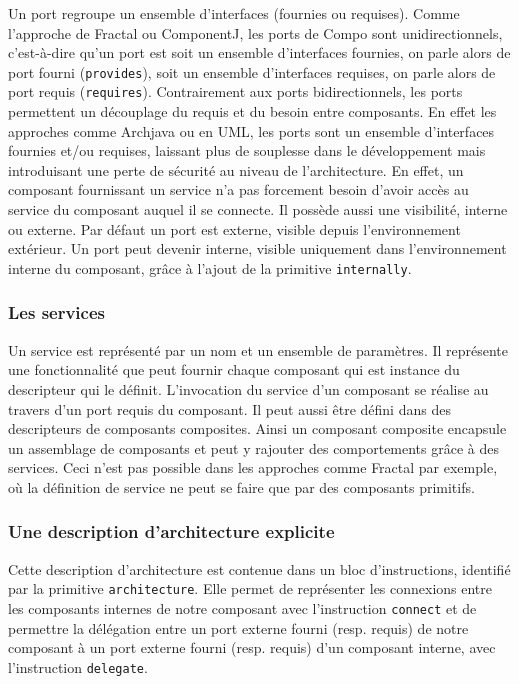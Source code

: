      Un port regroupe un ensemble d'interfaces (fournies ou requises). Comme l'approche de Fractal ou ComponentJ, les ports de Compo sont unidirectionnels, c'est-à-dire qu'un port est soit un ensemble d'interfaces fournies, on parle alors de port fourni (\texttt{provides}), soit un ensemble d'interfaces requises, on parle alors de port requis (\texttt{requires}). Contrairement aux ports bidirectionnels, les ports permettent un découplage du requis et du besoin entre composants. En effet les approches comme Archjava ou en UML, les ports sont un ensemble d'interfaces fournies et/ou requises, laissant plus de souplesse dans le développement mais introduisant une perte de sécurité au niveau de l'architecture. En effet, un composant fournissant un service n'a pas forcement besoin d'avoir accès au service du composant auquel il se connecte. Il possède aussi une visibilité, interne ou externe. Par défaut un port est externe, visible depuis l'environnement extérieur. Un port peut devenir interne, visible uniquement dans l'environnement interne du composant, grâce à l'ajout de la primitive \texttt{internally}.
    
    \subsubsection{Les services}
    
    Un service est représenté par un nom et un ensemble de paramètres. Il représente une fonctionnalité que peut fournir chaque composant qui est instance du descripteur qui le définit. L'invocation du service d'un composant se réalise au travers d'un port requis du composant. Il peut aussi être défini dans des descripteurs de composants composites. Ainsi un composant composite encapsule un assemblage de composants et peut y rajouter des comportements grâce à des services. Ceci n'est pas possible dans les approches comme Fractal par exemple, où la définition de service ne peut se faire que par des composants primitifs.
    
    \subsubsection{Une description d'architecture explicite}
      
      Cette description d'architecture est contenue dans un bloc d'instructions, identifié par la primitive \texttt{architecture}. Elle permet de représenter les connexions entre les composants internes de notre composant avec l’instruction \texttt{connect} et de permettre la délégation entre un port externe fourni (resp. requis) de notre composant à un port externe fourni (resp. requis) d'un composant interne, avec l'instruction \texttt{delegate}.
      
